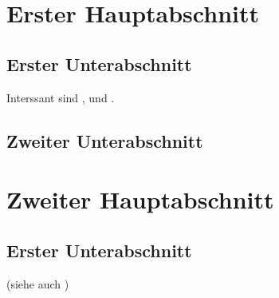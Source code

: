\begin{refsection}
\section*{Erster Hauptabschnitt}		%
\subsection*{Erster Unterabschnitt}		%
\blindtext			

Interssant sind \textcite{AlphaGo}, \textcite{alsina:2013} und \textcite{heuser:2005}.					
\subsection*{Zweiter Unterabschnitt}
\blindtext	
\section*{Zweiter Hauptabschnitt}		%
\subsection*{Erster Unterabschnitt}		%
\blindtext	(siehe auch \textcite{einstein:1923})

\RaggedRight
\printbibliography
\end{refsection}

